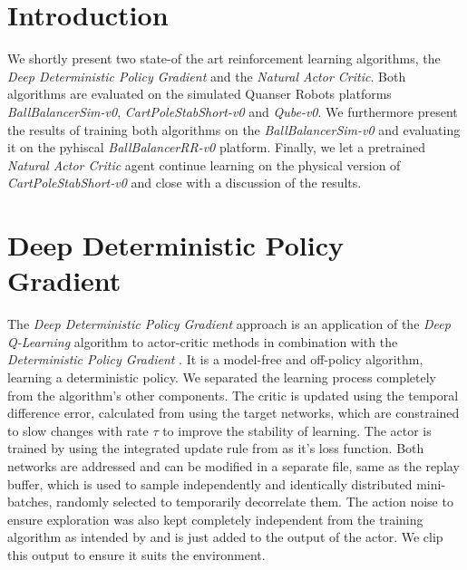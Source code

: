 
\author{Yannik Frisch \and Tabea Wilke \and Maximilian Gehrke %
}

\maketitle

\section{Introduction}
\label{sec:intro}
We shortly present two state-of the art reinforcement learning algorithms, the \textit{Deep Deterministic Policy Gradient} and the \textit{Natural Actor Critic}. Both algorithms are evaluated on the simulated Quanser Robots platforms \textit{BallBalancerSim-v0}, \textit{CartPoleStabShort-v0} and \textit{Qube-v0}. We furthermore present the results of training both algorithms on the \textit{BallBalancerSim-v0} and evaluating it on the pyhiscal \textit{BallBalancerRR-v0} platform. Finally, we let a pretrained \textit{Natural Actor Critic} agent continue learning on the physical version of \textit{CartPoleStabShort-v0} and close with a discussion of the results.
\newpage
\section{Deep Deterministic Policy Gradient}
\label{sec:ddpg}
The \textit{Deep Deterministic Policy Gradient} approach \citep{lillicrap2015continuous} is an application of the \textit{Deep Q-Learning} algorithm \citep{mnih2013playing} to actor-critic methods \citep{konda2000actor} in combination with the \textit{Deterministic Policy Gradient} \citep{silver2014deterministic}. It is a model-free and off-policy algorithm, learning a deterministic policy. We separated the learning process completely from the algorithm's other components. The critic is updated using the temporal difference error, calculated from using the target networks, which are constrained to slow changes with rate $\tau$ to improve the stability of learning. The actor is trained by using the integrated update rule from \cite{lillicrap2015continuous} as it's loss function. Both networks are addressed and can be modified in a separate file, same as the replay buffer, which is used to sample independently and identically distributed mini-batches, randomly selected to temporarily decorrelate them. The action noise to ensure exploration was also kept completely independent from the training algorithm as intended by \citep{lillicrap2015continuous} and is just added to the output of the actor. We clip this output to ensure it suits the environment.

